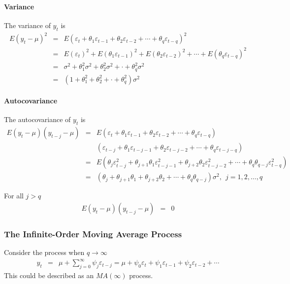 \paragraph{Variance}
The variance of $y_{t}$ is 
\begin{eqnarray*}
E(y_{t}-\mu)^{2}&=&E(\varepsilon_{t}+\theta_{1}\varepsilon_{t-1}+\theta_{2}\varepsilon_{t-2}+\cdots+\theta_{q}\varepsilon_{t-q})^{2}\\
&=&E(\varepsilon_{t})^{2}+E(\theta_{1}\varepsilon_{t-1})^{2}+E(\theta_{2}\varepsilon_{t-2})^{2}+\cdots+E(\theta_{q}\varepsilon_{t-q})^{2}\\
&=&\sigma^{2}+\theta_{1}^{2}\sigma^{2}+\theta_{2}^{2}\sigma^{2}+\cdot+\theta_{q}^{2}\sigma^{2}\\
&=&(1+\theta_{1}^{2}+\theta_{2}^{2}+\cdot+\theta_{q}^{2})\sigma^{2}
\end{eqnarray*}

\paragraph{Autocovariance}
The autocovariance of $y_{t}$ is 
\begin{eqnarray*}
E(y_{t}-\mu)(y_{t-j}-\mu)&=&E(\varepsilon_{t}+\theta_{1}\varepsilon_{t-1}+\theta_{2}\varepsilon_{t-2}+\cdots+\theta_{q}\varepsilon_{t-q})\\
&&(\varepsilon_{t-j}+\theta_{1}\varepsilon_{t-j-1}+\theta_{2}\varepsilon_{t-j-2}+\cdots+\theta_{q}\varepsilon_{t-j-q})\\
&=&E\left(\theta_{j}\varepsilon_{t-j}^{2}+\theta_{j+1}\theta_{1}\varepsilon_{t-j-1}^{2}+\theta_{j+2}\theta_{2}\varepsilon_{t-j-2}^{2}+\cdots+\theta_{q}\theta_{q-j}\varepsilon_{t-q}^{2}\right)\\
&=&\left(\theta_{j}+\theta_{j+1}\theta_{1}+\theta_{j+2}\theta_{2}+\cdots+\theta_{q}\theta_{q-j}\right)\sigma^{2}, \ \ \text{$j=1,2,\dots,q$}
\end{eqnarray*}

For all $j>q$
\begin{eqnarray*}
E(y_{t}-\mu)(y_{t-j}-\mu)&=&0
\end{eqnarray*}

\subsubsection{The Infinite-Order Moving Average Process}
Consider the process when $q\to\infty$ 
\begin{eqnarray*}
y_{t}&=&\mu+\sum_{j=0}^{\infty}\psi_{j}\varepsilon_{t-j}=\mu+\psi_{0}\varepsilon_{t}+\psi_{1}\varepsilon_{t-1}+\psi_{2}\varepsilon_{t-2}+\cdots
\end{eqnarray*}
This could be described as an $MA(\infty)$ process.

